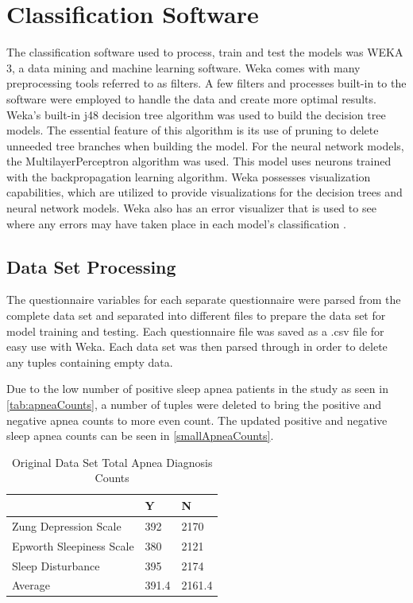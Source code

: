 \documentclass[10pt,conference,a4paper]{IEEEtran}
\begin{document}
\section{Classification Software}
\label{weka}

The classification software used to process, train and test the models was WEKA 3, a data mining and machine learning software. Weka comes with many preprocessing tools referred to as filters. A few filters and processes built-in to the software were employed to handle the data and create more optimal results. Weka’s built-in j48 decision tree algorithm was used to build the decision tree models. The essential feature of this algorithm is its use of pruning to delete unneeded tree branches when building the model. For the neural network models, the MultilayerPerceptron algorithm was used. This model uses neurons trained with the backpropagation learning algorithm. Weka possesses visualization capabilities, which are utilized to provide visualizations for the decision trees and neural network models. Weka also has an error visualizer that is used to see where any errors may have taken place in each model’s classification \cite{weka2016}. \par

\subsection{Data Set Processing}
The questionnaire variables for each separate questionnaire were parsed from the complete data set and separated into different files to prepare the data set for model training and testing. Each questionnaire file was saved as a .csv file for easy use with Weka. Each data set was then parsed through in order to delete any tuples containing empty data.\par
Due to the low number of positive sleep apnea patients in the study as seen in \autoref{tab:apneaCounts}, a number of tuples were deleted to bring the positive and negative apnea counts to more even count. The updated positive and negative sleep apnea counts can be seen in \autoref{smallApneaCounts}.\par

\begin{table}[h]
\centering
\begin{tabular}{@{}lll@{}}
\toprule
                           & Y     & N      \\ \midrule
Zung Depression Scale      & 392   & 2170   \\
Epworth Sleepiness Scale   & 380   & 2121   \\
Sleep Disturbance          & 395   & 2174   \\\midrule
Average                    & 391.4 & 2161.4 \\ \bottomrule
\end{tabular}
\caption{Original Data Set Total Apnea Diagnosis Counts}
\label{tab:apneaCounts}
\end{table}
\end{document}
